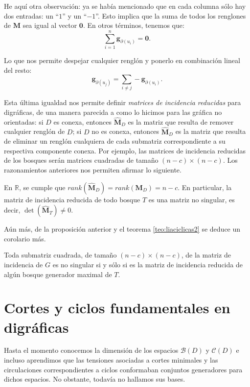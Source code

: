 He aquí otra observación: ya se había mencionado que en cada columna sólo hay dos entradas: un ``$1$'' y un ``$-1$''. Esto implica que la suma de todos los renglones de $\mathbf{M}$ sea igual al vector $\mathbf{0}$. En otros términos, tenemos que:
$$
\sum_{i = 1}^{n} \mathbf{g}_{\partial(u_{i})} = \mathbf{0}.
$$

Lo que nos permite despejar cualquier renglón y ponerlo en combinación lineal del resto:
$$
\mathbf{g}_{\partial(u_{j})} = \sum_{i \neq j} -\mathbf{g}_{\partial(u_{i})}.
$$

Esta última igualdad nos permite definir \textit{matrices de incidencia reducidas} para digráficas, de una manera parecida a como lo hicimos para las gráfica no orientadas: si $D$ es conexa, entonces $\widehat{\mathbf{M}}_{D}$ es la matriz que resulta de remover cualquier renglón de $D$; si $D$ no es conexa, entonces $\widehat{\mathbf{M}}_{D}$ es la matriz que resulta de eliminar un renglón cualquiera de cada submatriz correspondiente a su respectiva componente conexa. Por ejemplo, las matrices de incidencia reducidas de los bosques serán matrices cuadradas de tamaño $(n - c) \times (n - c)$. Los razonamientos anteriores nos permiten afirmar lo siguiente.

\begin{prop} \label{prop:rango2}
En $\mathbb{R}$, se cumple que $rank(\widehat{\mathbf{M}}_{D}) = rank(\mathbf{M}_{D})= n-c$. En particular, la matriz de incidencia reducida de todo bosque $T$ es una matriz no singular, es decir, $\det(\widehat{\mathbf{M}}_{T}) \neq 0$.
\end{prop}

Aún más, de la proposición anterior y el teorema \ref{teo:liaciclicas2} se deduce un corolario más.

\begin{cor}
Toda submatriz cuadrada, de tamaño $(n-c) \times (n-c)$, de la matriz de incidencia de $G$ es no singular si y sólo si es la matriz de incidencia reducida de algún bosque generador maximal de $T$.
\end{cor}
 

\section{Cortes y ciclos fundamentales en digráficas}
Hasta el momento conocemos la dimensión de los espacios $\mathcal{B}(D)$ y $\mathcal{C}(D)$ e incluso aprendimos que las tensiones asociadas a cortes minimales y las circulaciones correspondientes a ciclos conformaban conjuntos generadores para dichos espacios. No obstante, todavía no hallamos sus bases. 

